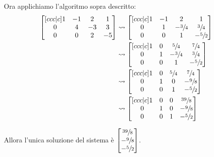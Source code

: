 \documentclass{article}
\begin{document}
Ora applichiamo l'algoritmo sopra descritto:
\[\begin{aligned}
    \begin{bmatrix}[ccc|c]
        1 & -1 & 2 & 1 \\
        0 & 4 & -3 & 3 \\
        0 & 0 & 2 & -5 \\
    \end{bmatrix} &\leadsto \begin{bmatrix}[ccc|c]
        1 & -1 & 2 & 1 \\
        0 & 1 & -\sfrac{3}{4} & \sfrac{3}{4} \\
        0 & 0 & 1 & -\sfrac{5}{2} \\
    \end{bmatrix} \\ &\leadsto \begin{bmatrix}[ccc|c]
        1 & 0 & \sfrac{5}{4} & \sfrac{7}{4} \\
        0 & 1 & -\sfrac{3}{4} & \sfrac{3}{4} \\
        0 & 0 & 1 & -\sfrac{5}{2} \\
    \end{bmatrix} \\ &\leadsto \begin{bmatrix}[ccc|c]
        1 & 0 & \sfrac{5}{4} & \sfrac{7}{4} \\
        0 & 1 & 0 & -\sfrac{9}{8} \\
        0 & 0 & 1 & -\sfrac{5}{2} \\
    \end{bmatrix} \\ &\leadsto \begin{bmatrix}[ccc|c]
        1 & 0 & 0 & \sfrac{39}{8} \\
        0 & 1 & 0 & -\sfrac{9}{8} \\
        0 & 0 & 1 & -\sfrac{5}{2} \\
    \end{bmatrix}
\end{aligned}\]

Allora l'unica soluzione del sistema è $\begin{bmatrix}
    \sfrac{39}{8} \\ -\sfrac{9}{8} \\ -\sfrac{5}{2}
\end{bmatrix}$.
\end{document}
